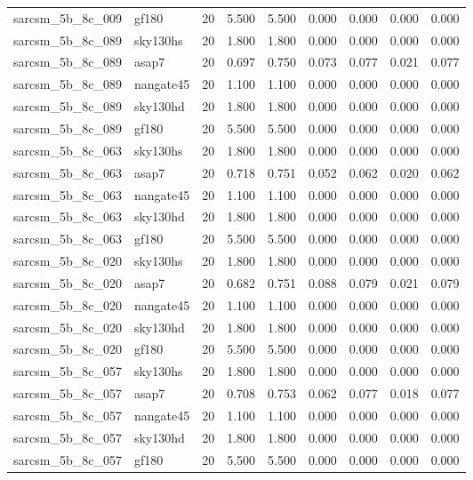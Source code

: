 \begin{tabular}{llrrrrrrr}
sarcsm\_5b\_8c\_009 & gf180 & 20 & 5.500 & 5.500 & 0.000 & 0.000 & 0.000 & 0.000 \\
sarcsm\_5b\_8c\_089 & sky130hs & 20 & 1.800 & 1.800 & 0.000 & 0.000 & 0.000 & 0.000 \\
sarcsm\_5b\_8c\_089 & asap7 & 20 & 0.697 & 0.750 & 0.073 & 0.077 & 0.021 & 0.077 \\
sarcsm\_5b\_8c\_089 & nangate45 & 20 & 1.100 & 1.100 & 0.000 & 0.000 & 0.000 & 0.000 \\
sarcsm\_5b\_8c\_089 & sky130hd & 20 & 1.800 & 1.800 & 0.000 & 0.000 & 0.000 & 0.000 \\
sarcsm\_5b\_8c\_089 & gf180 & 20 & 5.500 & 5.500 & 0.000 & 0.000 & 0.000 & 0.000 \\
sarcsm\_5b\_8c\_063 & sky130hs & 20 & 1.800 & 1.800 & 0.000 & 0.000 & 0.000 & 0.000 \\
sarcsm\_5b\_8c\_063 & asap7 & 20 & 0.718 & 0.751 & 0.052 & 0.062 & 0.020 & 0.062 \\
sarcsm\_5b\_8c\_063 & nangate45 & 20 & 1.100 & 1.100 & 0.000 & 0.000 & 0.000 & 0.000 \\
sarcsm\_5b\_8c\_063 & sky130hd & 20 & 1.800 & 1.800 & 0.000 & 0.000 & 0.000 & 0.000 \\
sarcsm\_5b\_8c\_063 & gf180 & 20 & 5.500 & 5.500 & 0.000 & 0.000 & 0.000 & 0.000 \\
sarcsm\_5b\_8c\_020 & sky130hs & 20 & 1.800 & 1.800 & 0.000 & 0.000 & 0.000 & 0.000 \\
sarcsm\_5b\_8c\_020 & asap7 & 20 & 0.682 & 0.751 & 0.088 & 0.079 & 0.021 & 0.079 \\
sarcsm\_5b\_8c\_020 & nangate45 & 20 & 1.100 & 1.100 & 0.000 & 0.000 & 0.000 & 0.000 \\
sarcsm\_5b\_8c\_020 & sky130hd & 20 & 1.800 & 1.800 & 0.000 & 0.000 & 0.000 & 0.000 \\
sarcsm\_5b\_8c\_020 & gf180 & 20 & 5.500 & 5.500 & 0.000 & 0.000 & 0.000 & 0.000 \\
sarcsm\_5b\_8c\_057 & sky130hs & 20 & 1.800 & 1.800 & 0.000 & 0.000 & 0.000 & 0.000 \\
sarcsm\_5b\_8c\_057 & asap7 & 20 & 0.708 & 0.753 & 0.062 & 0.077 & 0.018 & 0.077 \\
sarcsm\_5b\_8c\_057 & nangate45 & 20 & 1.100 & 1.100 & 0.000 & 0.000 & 0.000 & 0.000 \\
sarcsm\_5b\_8c\_057 & sky130hd & 20 & 1.800 & 1.800 & 0.000 & 0.000 & 0.000 & 0.000 \\
sarcsm\_5b\_8c\_057 & gf180 & 20 & 5.500 & 5.500 & 0.000 & 0.000 & 0.000 & 0.000 \\

\end{tabular}
